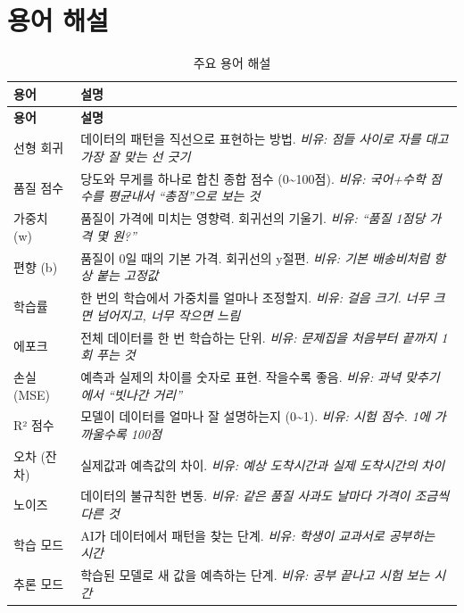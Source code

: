 \documentclass[11pt,a4paper]{article}
\begin{document}
\section{용어 해설}

\begin{longtable}{l|p{10cm}}
\caption{주요 용어 해설}
\label{tab:glossary}\\
\toprule
\textbf{용어} & \textbf{설명} \\
\midrule
\endfirsthead
\toprule
\textbf{용어} & \textbf{설명} \\
\midrule
\endhead
\bottomrule
\endfoot

선형 회귀 & 데이터의 패턴을 직선으로 표현하는 방법. 
\textit{비유: 점들 사이로 자를 대고 가장 잘 맞는 선 긋기} \\
\midrule

품질 점수 & 당도와 무게를 하나로 합친 종합 점수 (0\textasciitilde100점).
\textit{비유: 국어+수학 점수를 평균내서 ``총점''으로 보는 것} \\
\midrule

가중치 (w) & 품질이 가격에 미치는 영향력. 회귀선의 기울기.
\textit{비유: ``품질 1점당 가격 몇 원?''} \\
\midrule

편향 (b) & 품질이 0일 때의 기본 가격. 회귀선의 y절편.
\textit{비유: 기본 배송비처럼 항상 붙는 고정값} \\
\midrule

학습률 & 한 번의 학습에서 가중치를 얼마나 조정할지.
\textit{비유: 걸음 크기. 너무 크면 넘어지고, 너무 작으면 느림} \\
\midrule

에포크 & 전체 데이터를 한 번 학습하는 단위.
\textit{비유: 문제집을 처음부터 끝까지 1회 푸는 것} \\
\midrule

손실 (MSE) & 예측과 실제의 차이를 숫자로 표현. 작을수록 좋음.
\textit{비유: 과녁 맞추기에서 ``빗나간 거리''} \\
\midrule

R² 점수 & 모델이 데이터를 얼마나 잘 설명하는지 (0\textasciitilde1).
\textit{비유: 시험 점수. 1에 가까울수록 100점} \\
\midrule

오차 (잔차) & 실제값과 예측값의 차이.
\textit{비유: 예상 도착시간과 실제 도착시간의 차이} \\
\midrule

노이즈 & 데이터의 불규칙한 변동.
\textit{비유: 같은 품질 사과도 날마다 가격이 조금씩 다른 것} \\
\midrule

학습 모드 & AI가 데이터에서 패턴을 찾는 단계.
\textit{비유: 학생이 교과서로 공부하는 시간} \\
\midrule

추론 모드 & 학습된 모델로 새 값을 예측하는 단계.
\textit{비유: 공부 끝나고 시험 보는 시간} \\

\end{longtable}
\end{document}
